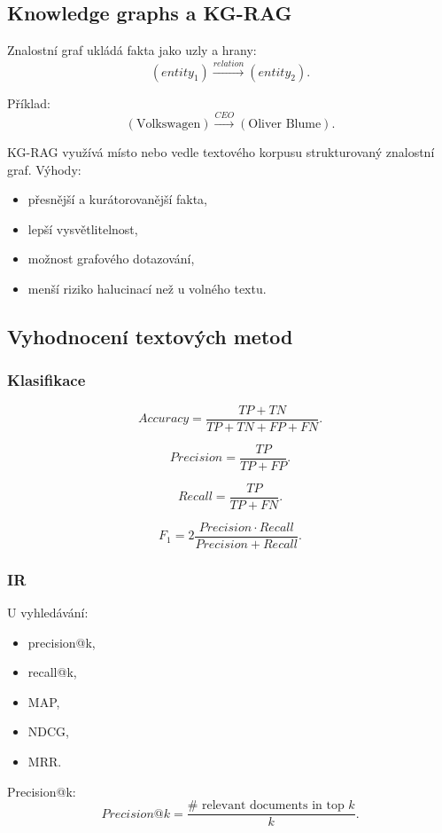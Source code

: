 \subsection{Knowledge graphs a KG-RAG}

Znalostní graf ukládá fakta jako uzly a hrany:
\[
(entity_1) \xrightarrow{relation} (entity_2).
\]

Příklad:
\[
(\text{Volkswagen}) \xrightarrow{CEO} (\text{Oliver Blume}).
\]

KG-RAG využívá místo nebo vedle textového korpusu strukturovaný znalostní graf. Výhody:
\begin{itemize}
    \item přesnější a kurátorovanější fakta,
    \item lepší vysvětlitelnost,
    \item možnost grafového dotazování,
    \item menší riziko halucinací než u volného textu.
\end{itemize}

\subsection{Vyhodnocení textových metod}

\subsubsection{Klasifikace}

\[
Accuracy=
\frac{TP+TN}{TP+TN+FP+FN}.
\]

\[
Precision=
\frac{TP}{TP+FP}.
\]

\[
Recall=
\frac{TP}{TP+FN}.
\]

\[
F_1=
2\frac{Precision\cdot Recall}{Precision+Recall}.
\]

\subsubsection{IR}

U vyhledávání:
\begin{itemize}
    \item precision@k,
    \item recall@k,
    \item MAP,
    \item NDCG,
    \item MRR.
\end{itemize}

Precision@k:
\[
Precision@k
=
\frac{\#\text{ relevant documents in top } k}
{k}.
\]

